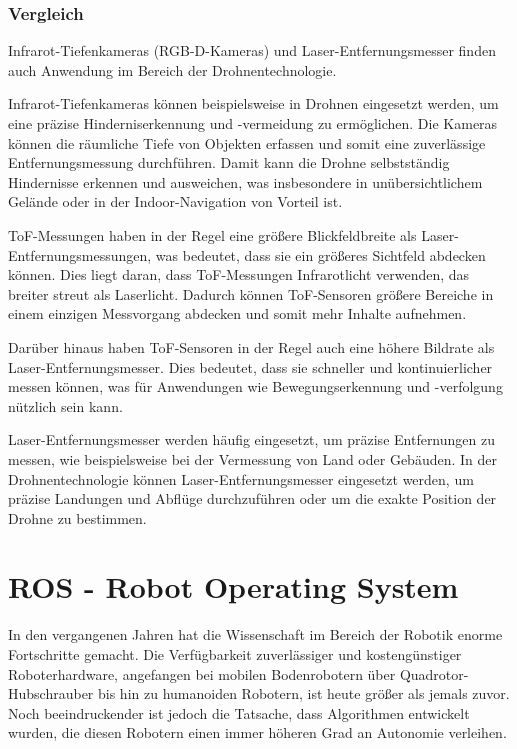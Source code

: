     \subsubsection{Vergleich}\label{chp:depth-sensor-compar}
    Infrarot-Tiefenkameras (RGB-D-Kameras) und Laser-Entfernungsmesser finden auch Anwendung im Bereich der Drohnentechnologie.

Infrarot-Tiefenkameras können beispielsweise in Drohnen eingesetzt werden, um eine präzise Hinderniserkennung und -vermeidung zu ermöglichen. Die Kameras können die räumliche Tiefe von Objekten erfassen und somit eine zuverlässige Entfernungsmessung durchführen. Damit kann die Drohne selbstständig Hindernisse erkennen und ausweichen, was insbesondere in unübersichtlichem Gelände oder in der Indoor-Navigation von Vorteil ist.

ToF-Messungen haben in der Regel eine größere Blickfeldbreite als Laser-Entfernungsmessungen, was bedeutet, dass sie ein größeres Sichtfeld abdecken können. Dies liegt daran, dass ToF-Messungen Infrarotlicht verwenden, das breiter streut als Laserlicht. Dadurch können ToF-Sensoren größere Bereiche in einem einzigen Messvorgang abdecken und somit mehr Inhalte aufnehmen.

Darüber hinaus haben ToF-Sensoren in der Regel auch eine höhere Bildrate als Laser-Entfernungsmesser. Dies bedeutet, dass sie schneller und kontinuierlicher messen können, was für Anwendungen wie Bewegungserkennung und -verfolgung nützlich sein kann.

Laser-Entfernungsmesser werden häufig eingesetzt, um präzise Entfernungen zu messen, wie beispielsweise bei der Vermessung von Land oder Gebäuden. In der Drohnentechnologie können Laser-Entfernungsmesser eingesetzt werden, um präzise Landungen und Abflüge durchzuführen oder um die exakte Position der Drohne zu bestimmen.




\section{ROS - Robot Operating System} \label{ros:section}
In den vergangenen Jahren hat die Wissenschaft im Bereich der Robotik enorme Fortschritte gemacht. Die Verfügbarkeit zuverlässiger und kostengünstiger Roboterhardware, angefangen bei mobilen Bodenrobotern über Quadrotor-Hubschrauber bis hin zu humanoiden Robotern, ist heute größer als jemals zuvor. Noch beeindruckender ist jedoch die Tatsache, dass Algorithmen entwickelt wurden, die diesen Robotern einen immer höheren Grad an Autonomie verleihen.

